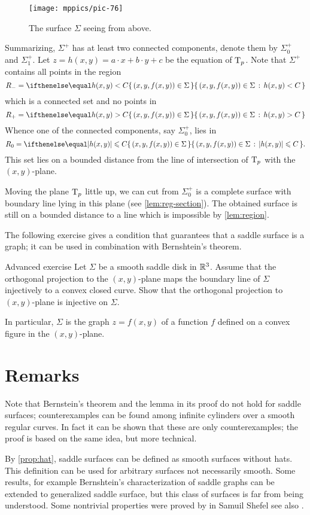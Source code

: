\begin{figure}[h!]
\vskip-0mm
\centering
\texttt{[image: mppics/pic-76]}
\caption*{The surface $\Sigma$ seeing from above.}
\vskip0mm
\end{figure}

Summarizing, $\Sigma^+$ has at least two connected components, denote them by $\Sigma^+_0$ and $\Sigma^+_1$.
Let $z=h(x,y)=a\cdot x+b\cdot y+c$ be the equation of $\mathrm{T}_p$.
Note that $\Sigma^+$ contains all points in the region
\[R_-=\set{(x,y,f(x,y))\in\Sigma}{h(x,y)< C}\] 
which is a connected set and no points in 
\[R_+=\set{(x,y,f(x,y))\in\Sigma}{h(x,y)> C}\]
Whence one of the connected components, say $\Sigma^+_0$, lies in 
\[R_0=\set{(x,y,f(x,y))\in\Sigma}{|h(x,y)|\le  C}.\]
This set lies on a bounded distance from the line of intersection of $\mathrm{T}_p$ with the $(x,y)$-plane.

Moving the plane $\mathrm{T}_p$ little up, we can cut from $\Sigma^+_0$ is a complete surface with boundary line lying in this plane (see \ref{lem:reg-section}).
The obtained surface is still on a bounded distance to a line
which is impossible by \ref{lem:region}.
\qeds

The following exercise gives a condition that guarantees that a saddle surface is a graph;
it can be used in combination with Bernshtein's theorem.

\begin{thm}{Advanced exercise}
Let $\Sigma$ be a smooth saddle disk in $\mathbb{R}^3$.
Assume that the orthogonal projection to the $(x,y)$-plane
maps the boundary line of $\Sigma$
injectively to a convex closed curve.
Show that the orthogonal projection to $(x,y)$-plane is injective on $\Sigma$.

In particular, $\Sigma$ is the graph $z=f(x,y)$ of a function $f$ defined on a convex figure in the $(x,y)$-plane.
\end{thm}


\section*{Remarks}

Note that Bernstein's theorem and the lemma in its proof do not hold for saddle surfaces;
counterexamples can be found among infinite cylinders over a smooth regular curves.
In fact it can be shown that these are only counterexamples;
the proof is based on the same idea, but more technical.

By \ref{prop:hat}, saddle surfaces can be defined as smooth surfaces without hats.
This definition can be used for arbitrary surfaces not necessarily smooth.
Some results, for example Bernshtein's characterization of saddle graphs can be extended to generalized saddle surface, but this class of surfaces is far from being understood.
Some nontrivial properties were proved by in Samuil Shefel \cite{shefel} see also \cite[Capter 4]{akp}.
